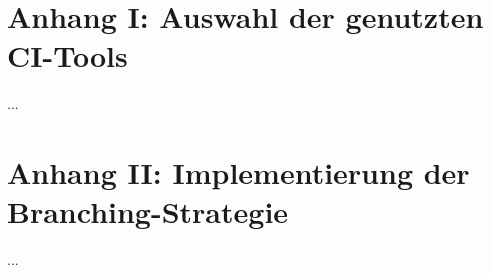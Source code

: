 
\section{Anhang I: Auswahl der genutzten CI-Tools} \label{sec:appendix-1}

...

\section{Anhang II: Implementierung der Branching-Strategie} \label{sec:appendix-2}

...
